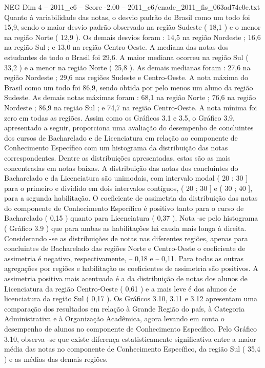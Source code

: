 \begin{textsample}{NEG Dim 4 – 2011\_c6 – Score -2.00 – 2011\_c6/enade\_2011\_fis\_063ad74c0e.txt}
Quanto à variabilidade das notas, o desvio padrão do Brasil como um todo foi 15,9, sendo o maior desvio padrão observado na região Sudeste ( 18,1 ) e o menor na região Norte ( 12,9 ).
Os demais desvios foram : 14,5 na região Nordeste ; 16,6 na região Sul ; e 13,0 na região Centro-Oeste.
A mediana das notas dos estudantes de todo o Brasil foi 29,6.
A maior mediana ocorreu na região Sul ( 33,2 ) e a menor na região Norte ( 25,8 ).
As demais medianas foram : 27,6 na região Nordeste ; 29,6 nas regiões Sudeste e Centro-Oeste.
A nota máxima do Brasil como um todo foi 86,9, sendo obtida por pelo menos um aluno da região Sudeste.
As demais notas máximas foram : 68,1 na região Norte ; 76,6 na região Nordeste ; 86,9 na região Sul ; e 74,7 na região Centro-Oeste.
A nota mínima foi zero em todas as regiões.
Assim como os Gráficos 3.1 e 3.5, o Gráfico 3.9, apresentado a seguir, proporciona uma avaliação do desempenho de concluintes dos cursos de Bacharelado e de Licenciatura em relação ao componente de Conhecimento Específico com um histograma da distribuição das notas correspondentes.
Dentre as distribuições apresentadas, estas são as mais concentradas em notas baixas.
A distribuição das notas dos concluintes do Bacharelado e da Licenciatura são unimodais, com intervalo modal ( 20 ; 30 ] para o primeiro e dividido em dois intervalos contíguos, ( 20 ; 30 ] e ( 30 ; 40 ], para a segunda habilitação.
O coeficiente de assimetria da distribuição das notas do componente de Conhecimento Específico é positivo tanto para o curso de Bacharelado ( 0,15 ) quanto para Licenciatura ( 0,37 ).
Nota -se pelo histograma ( Gráfico 3.9 ) que para ambas as habilitações há cauda mais longa à direita.
Considerando -se as distribuições de notas nas diferentes regiões, apenas para concluintes de Bacharelado das regiões Norte e Centro-Oeste o coeficiente de assimetria é negativo, respectivamente, – 0,18 e – 0,11.
Para todas as outras agregações por regiões e habilitação os coeficientes de assimetria são positivos.
A assimetria positiva mais acentuada é a da distribuição de notas dos alunos de Licenciatura da região Centro-Oeste ( 0,61 ) e a mais leve é dos alunos de licenciatura da região Sul ( 0,17 ).
Os Gráficos 3.10, 3.11 e 3.12 apresentam uma comparação dos resultados em relação à Grande Região do país, à Categoria Administrativa e à Organização Acadêmica, agora levando em conta o desempenho de alunos no componente de Conhecimento Específico.
Pelo Gráfico 3.10, observa -se que existe diferença estatisticamente significativa entre a maior média das notas no componente de Conhecimento Específico, da região Sul ( 35,4 ) e as médias das demais regiões.

\end{textsample}
